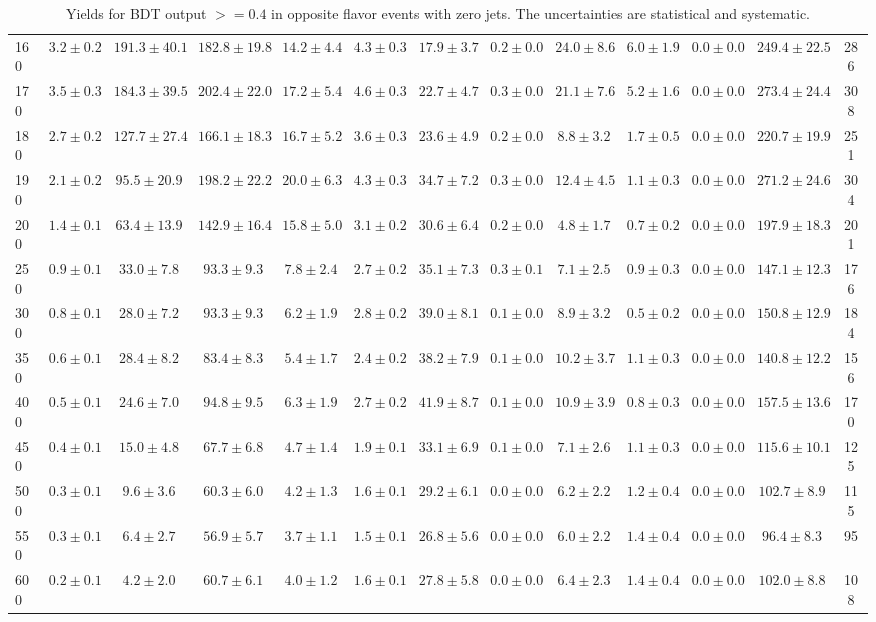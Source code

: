 \begin{table}
{\begin{center}
\begin{tabular}{l | c c | c c c c c c c c  | c c}
160 & $3.2\pm0.2$ & $191.3\pm40.1$ & $182.8\pm19.8$ & $14.2\pm4.4$ & $4.3\pm0.3$ & $17.9\pm3.7$ & $0.2\pm0.0$ & $24.0\pm8.6$ & $6.0\pm1.9$ & $0.0\pm0.0$ & $249.4\pm22.5$ & 286 \\
170 & $3.5\pm0.3$ & $184.3\pm39.5$ & $202.4\pm22.0$ & $17.2\pm5.4$ & $4.6\pm0.3$ & $22.7\pm4.7$ & $0.3\pm0.0$ & $21.1\pm7.6$ & $5.2\pm1.6$ & $0.0\pm0.0$ & $273.4\pm24.4$ & 308 \\
180 & $2.7\pm0.2$ & $127.7\pm27.4$ & $166.1\pm18.3$ & $16.7\pm5.2$ & $3.6\pm0.3$ & $23.6\pm4.9$ & $0.2\pm0.0$ & $8.8\pm3.2$ & $1.7\pm0.5$ & $0.0\pm0.0$ & $220.7\pm19.9$ & 251 \\
190 & $2.1\pm0.2$ & $95.5\pm20.9$ & $198.2\pm22.2$ & $20.0\pm6.3$ & $4.3\pm0.3$ & $34.7\pm7.2$ & $0.3\pm0.0$ & $12.4\pm4.5$ & $1.1\pm0.3$ & $0.0\pm0.0$ & $271.2\pm24.6$ & 304 \\
200 & $1.4\pm0.1$ & $63.4\pm13.9$ & $142.9\pm16.4$ & $15.8\pm5.0$ & $3.1\pm0.2$ & $30.6\pm6.4$ & $0.2\pm0.0$ & $4.8\pm1.7$ & $0.7\pm0.2$ & $0.0\pm0.0$ & $197.9\pm18.3$ & 201 \\
250 & $0.9\pm0.1$ & $33.0\pm7.8$ & $93.3\pm9.3$ & $7.8\pm2.4$ & $2.7\pm0.2$ & $35.1\pm7.3$ & $0.3\pm0.1$ & $7.1\pm2.5$ & $0.9\pm0.3$ & $0.0\pm0.0$ & $147.1\pm12.3$ & 176 \\
300 & $0.8\pm0.1$ & $28.0\pm7.2$ & $93.3\pm9.3$ & $6.2\pm1.9$ & $2.8\pm0.2$ & $39.0\pm8.1$ & $0.1\pm0.0$ & $8.9\pm3.2$ & $0.5\pm0.2$ & $0.0\pm0.0$ & $150.8\pm12.9$ & 184 \\
350 & $0.6\pm0.1$ & $28.4\pm8.2$ & $83.4\pm8.3$ & $5.4\pm1.7$ & $2.4\pm0.2$ & $38.2\pm7.9$ & $0.1\pm0.0$ & $10.2\pm3.7$ & $1.1\pm0.3$ & $0.0\pm0.0$ & $140.8\pm12.2$ & 156 \\
400 & $0.5\pm0.1$ & $24.6\pm7.0$ & $94.8\pm9.5$ & $6.3\pm1.9$ & $2.7\pm0.2$ & $41.9\pm8.7$ & $0.1\pm0.0$ & $10.9\pm3.9$ & $0.8\pm0.3$ & $0.0\pm0.0$ & $157.5\pm13.6$ & 170 \\
450 & $0.4\pm0.1$ & $15.0\pm4.8$ & $67.7\pm6.8$ & $4.7\pm1.4$ & $1.9\pm0.1$ & $33.1\pm6.9$ & $0.1\pm0.0$ & $7.1\pm2.6$ & $1.1\pm0.3$ & $0.0\pm0.0$ & $115.6\pm10.1$ & 125 \\
500 & $0.3\pm0.1$ & $9.6\pm3.6$ & $60.3\pm6.0$ & $4.2\pm1.3$ & $1.6\pm0.1$ & $29.2\pm6.1$ & $0.0\pm0.0$ & $6.2\pm2.2$ & $1.2\pm0.4$ & $0.0\pm0.0$ & $102.7\pm8.9$ & 115 \\
550 & $0.3\pm0.1$ & $6.4\pm2.7$ & $56.9\pm5.7$ & $3.7\pm1.1$ & $1.5\pm0.1$ & $26.8\pm5.6$ & $0.0\pm0.0$ & $6.0\pm2.2$ & $1.4\pm0.4$ & $0.0\pm0.0$ & $96.4\pm8.3$ & 95 \\
600 & $0.2\pm0.1$ & $4.2\pm2.0$ & $60.7\pm6.1$ & $4.0\pm1.2$ & $1.6\pm0.1$ & $27.8\pm5.8$ & $0.0\pm0.0$ & $6.4\pm2.3$ & $1.4\pm0.4$ & $0.0\pm0.0$ & $102.0\pm8.8$ & 108 \\
\hline
\end{tabular}
\end{center}
\caption{Yields for BDT output $>=0.4$ in opposite flavor events with zero jets. The uncertainties are statistical and systematic.\label{tab:yields_bdthi_0j}}
}
\end{table}

